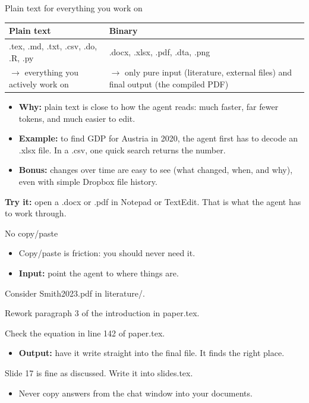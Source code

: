 \documentclass[aspectratio=169,11pt]{beamer}
\newcommand{\prompt}[1]{\begin{promptbox}\textcolor{accent}{\faCommentDots}\enspace #1\end{promptbox}}
\newcommand{\icon}[1]{\textcolor{accent}{#1}}
\begin{document}
\begin{frame}{Plain text for everything you work on}
  \renewcommand{\arraystretch}{1.3}
  \begin{tabularx}{\linewidth}{@{}Y Y@{}}
    \icon{\faFile*}\enspace\textbf{Plain text} & \icon{\faFileArchive}\enspace\textbf{Binary} \\
    \midrule
    .tex, .md, .txt, .csv, .do, .R, .py & .docx, .xlsx, .pdf, .dta, .png \\
    $\rightarrow$ everything you actively work on & $\rightarrow$ only pure input (literature, external files) and final output (the compiled PDF) \\
    \bottomrule
  \end{tabularx}
  \vspace{0.3em}
  \begin{itemize}
    \item \textbf{Why:} plain text is close to how the agent reads: much faster, far fewer tokens, and much easier to edit.
    \item \textbf{Example:} to find GDP for Austria in 2020, the agent first has to decode an .xlsx file. In a .csv, one quick search returns the number.
    \item \textbf{Bonus:} changes over time are easy to see (what changed, when, and why), even with simple Dropbox file history.
  \end{itemize}
  \begin{keybox}
    \icon{\faLightbulb}\enspace\textbf{Try it:} open a .docx or .pdf in Notepad or TextEdit. That is what the agent has to work through.
  \end{keybox}
\end{frame}

\begin{frame}{No copy/paste}
  \begin{itemize}
    \item Copy/paste is friction: you should never need it.
    \item \textbf{Input:} point the agent to where things are.
  \end{itemize}
  \prompt{Consider Smith2023.pdf in literature/.}
  \prompt{Rework paragraph 3 of the introduction in paper.tex.}
  \prompt{Check the equation in line 142 of paper.tex.}
  \begin{itemize}
    \item \textbf{Output:} have it write straight into the final file. It finds the right place.
  \end{itemize}
  \prompt{Slide 17 is fine as discussed. Write it into slides.tex.}
  \begin{itemize}
    \item Never copy answers from the chat window into your documents.
  \end{itemize}
\end{frame}
\end{document}
